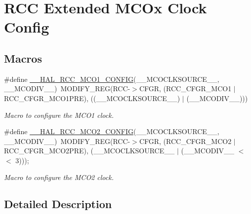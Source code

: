 \hypertarget{group___r_c_c_ex___m_c_ox___clock___config}{}\section{R\+CC Extended M\+C\+Ox Clock Config}
\label{group___r_c_c_ex___m_c_ox___clock___config}
\subsection*{Macros}
\begin{DoxyCompactItemize}
\item 
\#define \hyperlink{group___r_c_c_ex___m_c_ox___clock___config_ga7e5f7f1efc92794b6f0e96068240b45e}{\+\_\+\+\_\+\+H\+A\+L\+\_\+\+R\+C\+C\+\_\+\+M\+C\+O1\+\_\+\+C\+O\+N\+F\+IG}(\+\_\+\+\_\+\+M\+C\+O\+C\+L\+K\+S\+O\+U\+R\+C\+E\+\_\+\+\_\+,  \+\_\+\+\_\+\+M\+C\+O\+D\+I\+V\+\_\+\+\_\+)~M\+O\+D\+I\+F\+Y\+\_\+\+R\+EG(R\+CC-\/$>$C\+F\+GR, (R\+C\+C\+\_\+\+C\+F\+G\+R\+\_\+\+M\+C\+O1 $\vert$ R\+C\+C\+\_\+\+C\+F\+G\+R\+\_\+\+M\+C\+O1\+P\+RE), ((\+\_\+\+\_\+\+M\+C\+O\+C\+L\+K\+S\+O\+U\+R\+C\+E\+\_\+\+\_\+) $\vert$ (\+\_\+\+\_\+\+M\+C\+O\+D\+I\+V\+\_\+\+\_\+)))
\begin{DoxyCompactList}\small\item\em Macro to configure the M\+C\+O1 clock. \end{DoxyCompactList}\item 
\#define \hyperlink{group___r_c_c_ex___m_c_ox___clock___config_gabb7360422910dd65312786fc49722d25}{\+\_\+\+\_\+\+H\+A\+L\+\_\+\+R\+C\+C\+\_\+\+M\+C\+O2\+\_\+\+C\+O\+N\+F\+IG}(\+\_\+\+\_\+\+M\+C\+O\+C\+L\+K\+S\+O\+U\+R\+C\+E\+\_\+\+\_\+,  \+\_\+\+\_\+\+M\+C\+O\+D\+I\+V\+\_\+\+\_\+)~M\+O\+D\+I\+F\+Y\+\_\+\+R\+EG(R\+CC-\/$>$C\+F\+GR, (R\+C\+C\+\_\+\+C\+F\+G\+R\+\_\+\+M\+C\+O2 $\vert$ R\+C\+C\+\_\+\+C\+F\+G\+R\+\_\+\+M\+C\+O2\+P\+RE), (\+\_\+\+\_\+\+M\+C\+O\+C\+L\+K\+S\+O\+U\+R\+C\+E\+\_\+\+\_\+ $\vert$ (\+\_\+\+\_\+\+M\+C\+O\+D\+I\+V\+\_\+\+\_\+ $<$$<$ 3)));
\begin{DoxyCompactList}\small\item\em Macro to configure the M\+C\+O2 clock. \end{DoxyCompactList}\end{DoxyCompactItemize}


\subsection{Detailed Description}


